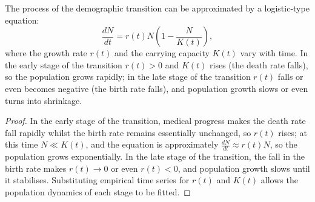\begin{proposition}\label{prop:demographic_transition_s}
The process of the demographic transition can be approximated by a logistic-type equation:
\[
\frac{dN}{dt} = r(t) N \left(1 - \frac{N}{K(t)}\right),
\]
where the growth rate $r(t)$ and the carrying capacity $K(t)$ vary with time. In the early stage of the transition $r(t) > 0$ and $K(t)$ rises (the death rate falls), so the population grows rapidly; in the late stage of the transition $r(t)$ falls or even becomes negative (the birth rate falls), and population growth slows or even turns into shrinkage.
\end{proposition}

\begin{proof}
In the early stage of the transition, medical progress makes the death rate fall rapidly whilst the birth rate remains essentially unchanged, so $r(t)$ rises; at this time $N \ll K(t)$, and the equation is approximately $\frac{dN}{dt} \approx r(t) N$, so the population grows exponentially. In the late stage of the transition, the fall in the birth rate makes $r(t) \to 0$ or even $r(t) < 0$, and population growth slows until it stabilises. Substituting empirical time series for $r(t)$ and $K(t)$ allows the population dynamics of each stage to be fitted.
\end{proof}

